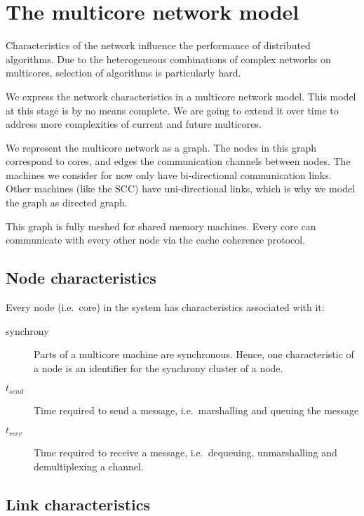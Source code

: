 \documentclass{article}
\begin{document}
\section{The multicore network model}

Characteristics of the network influence the performance of
distributed algorithms. Due to the heterogeneous combinations of
complex networks on multicores, selection of algorithms is
particularly hard.

We express the network characteristics in a multicore network
model. This model at this stage is by no means complete. We are going to
extend it over time to address more complexities of current and future
multicores.

We represent the multicore network as a graph. The nodes in this graph
correspond to cores, and edges the communication channels between
nodes. The machines we consider for now only have bi-directional
communication links. Other machines (like the SCC) have
uni-directional links, which is why we model the graph as directed
graph.

This graph is fully meshed for shared memory machines. Every core can
communicate with every other node via the cache coherence protocol.

\subsection{Node characteristics} 

Every node (i.e.\ core) in the system has characteristics associated
with it:

\begin{description}
\item[synchrony] Parts of a multicore machine are synchronous. Hence,
  one characteristic of a node is an identifier for the synchrony
  cluster of a node.
\item[$t_{send}$] Time required to send a message, i.e.\ marshalling
  and queuing the message
\item[$t_{recv}$] Time required to receive a message, i.e.\
  dequeuing, unmarshalling and demultiplexing a channel. 
\end{description}

\subsection{Link characteristics} 
\end{document}
